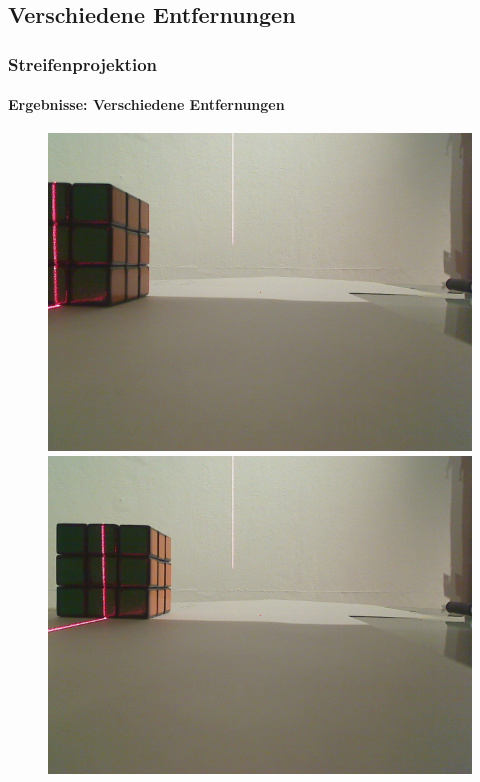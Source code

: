 \documentclass{beamer}
\begin{document}
\subsection{Verschiedene Entfernungen}
\begin{frame}
	\frametitle{Streifenprojektion}
	\framesubtitle{Ergebnisse: Verschiedene Entfernungen}

	\begin{figure}
		\begin{minipage}{0.32\linewidth}
			\includegraphics[width=\linewidth]{includes/test_dist_1}
		\end{minipage}
		\hfill
		\begin{minipage}{0.32\linewidth}
			\includegraphics[width=\linewidth]{includes/test_dist_2}

\end{minipage}
\end{figure}
\end{frame}
\end{document}
